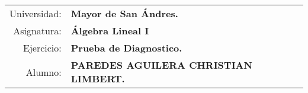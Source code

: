 \begin{tabular}{r l }
Universidad: & \textbf{Mayor de San Ándres.}\\
Asignatura: & \textbf{Álgebra Lineal I}\\
Ejercicio: & \textbf{Prueba de Diagnostico.}\\ 
Alumno: & \textbf{PAREDES AGUILERA CHRISTIAN LIMBERT.}
\end{tabular}
\begin{flushleft}
\end{flushleft}
